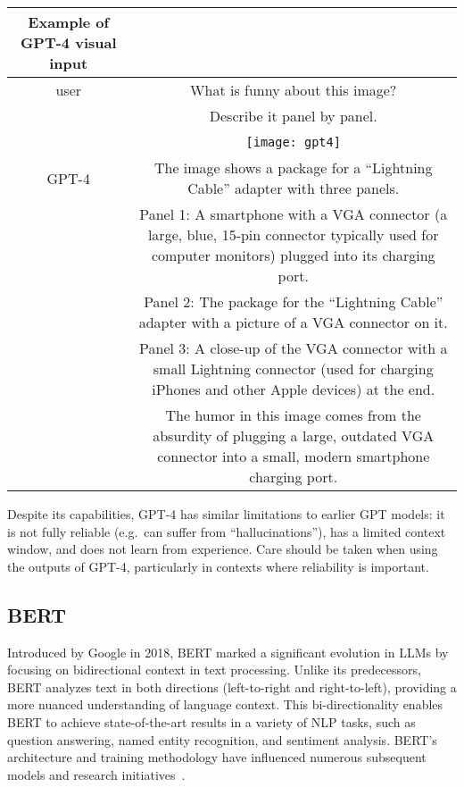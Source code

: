 \begin{center}
    \begin{tabular}{ c c }
        \hline
        Example of GPT-4 visual input\\
        \hline
        user & What is funny about this image?\\
        ~ & Describe it panel by panel.\\
        ~ & \texttt{[image: gpt4]} \\
        GPT-4 & {The image shows a package for a \enquote{Lightning Cable} adapter with three panels.}\\
        ~ & {\raggedleft Panel 1: A smartphone with a VGA connector (a large, blue, 15-pin connector typically used for computer monitors) plugged into its charging port.}\\
        ~ & {\raggedleft Panel 2: The package for the \enquote{Lightning Cable} adapter with a picture of a VGA connector on it.}\\
        ~ & {\raggedleft Panel 3: A close-up of the VGA connector with a small Lightning connector (used for charging iPhones and other Apple devices) at the end.}\\
        ~ & {\raggedleft The humor in this image comes from the absurdity of plugging a large, outdated VGA connector into a small, modern smartphone charging port.}
    \end{tabular}
\end{center}

Despite its capabilities, GPT-4 has similar limitations to earlier GPT models: it is not fully reliable (e.g.\ can suffer from \enquote{hallucinations}), has a limited context window, and does not learn from experience.
Care should be taken when using the outputs of GPT-4, particularly in contexts where reliability is important.

\subsection{BERT}
\label{subsec:bert}

Introduced by Google in 2018, BERT marked a significant evolution in LLMs by focusing on bidirectional context in text processing.
Unlike its predecessors, BERT analyzes text in both directions (left-to-right and right-to-left), providing a more nuanced understanding of language context.
This bi-directionality enables BERT to achieve state-of-the-art results in a variety of NLP tasks, such as question answering, named entity recognition, and sentiment analysis.
BERT's architecture and training methodology have influenced numerous subsequent models and research initiatives~\cite{bert}.

